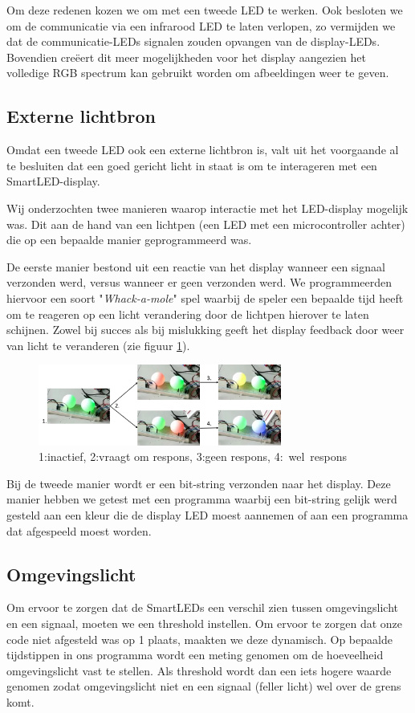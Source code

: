 \documentclass{article}
\begin{document}
Om deze redenen kozen we om met een tweede LED te werken. Ook besloten we om de communicatie via een infrarood LED te laten verlopen, zo vermijden we dat de communicatie-LEDs signalen zouden opvangen van de display-LEDs. Bovendien creëert dit meer mogelijkheden voor het display aangezien het volledige RGB spectrum kan gebruikt worden om afbeeldingen weer te geven. 

\subsection{Externe lichtbron}
Omdat een tweede LED ook een externe lichtbron is, valt uit het voorgaande al te besluiten dat een goed gericht licht in staat is om te interageren met een SmartLED-display. 

Wij onderzochten twee manieren waarop interactie met het LED-display mogelijk was. Dit aan de hand van een lichtpen (een LED met een microcontroller achter) die op een bepaalde manier geprogrammeerd was.

De eerste manier bestond uit een reactie van het display wanneer een signaal verzonden werd, versus wanneer er geen verzonden werd. We programmeerden hiervoor een soort "\textit{Whack-a-mole}" spel waarbij de speler een bepaalde tijd heeft om te reageren op een licht verandering door de lichtpen hierover te laten schijnen. Zowel bij succes als bij mislukking geeft het display feedback door weer van licht te veranderen (zie figuur \ref{fig:mole}).
\begin{figure}
\centering
\includegraphics[width=8cm]{moleSequence.png}
\caption{1:inactief, 2:vraagt om respons, 3:geen respons, \mbox{4: wel respons}}
\label{fig:mole}
\end{figure}

Bij de tweede manier wordt er een bit-string verzonden naar het display. Deze manier hebben we getest met een programma waarbij een bit-string gelijk werd gesteld aan een kleur die de display LED moest aannemen of aan een programma dat afgespeeld moest worden.

\subsection{Omgevingslicht}
Om ervoor te zorgen dat de SmartLEDs een verschil zien tussen omgevingslicht en een signaal, moeten we een threshold instellen. Om ervoor te zorgen dat onze code niet afgesteld was op 1 plaats, maakten we deze dynamisch. Op bepaalde tijdstippen in ons programma wordt een meting genomen om de hoeveelheid omgevingslicht vast te stellen. Als threshold wordt dan een iets hogere waarde genomen zodat omgevingslicht niet en een signaal (feller licht) wel over de grens komt.
\end{document}
